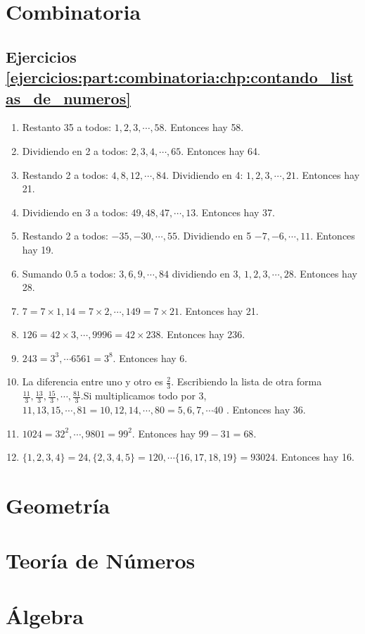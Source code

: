 \chapter{Combinatoria}\label{sol:chapter:combinatoria}



\section{Ejercicios \ref{ejercicios:part:combinatoria:chp:contando_listas_de_numeros}}
\begin{enumerate}
	\item Restanto 35 a todos: $1,2,3,\cdots, 58$. Entonces hay 58.
	\item Dividiendo en 2 a todos: $2,3,4,\cdots, 65$. Entonces hay 64.
	\item Restando 2 a todos: $4,8,12,\cdots, 84$. Dividiendo en 4: $1,2,3,\cdots, 21$. Entonces hay 21.
	\item Dividiendo en 3 a todos: $49,48,47,\cdots, 13$. Entonces hay 37.
	\item Restando 2 a todos: $-35, -30, \cdots, 55$. Dividiendo en 5 $-7,-6, \cdots, 11$. Entonces hay 19. 
	\item Sumando $0.5$ a todos: $3,6,9,\cdots, 84$ dividiendo en 3, $1,2,3,\cdots, 28$. Entonces hay 28.
	\item $7=7\times 1,14=7\times 2,\cdots, 149=7\times 21$. Entonces hay 21.
	\item $126=42\times 3, \cdots, 9996=42\times 238$. Entonces hay 236.
	
	\item $243=3^3,\cdots 6561=3^8$. Entonces hay 6.
	

	\item La diferencia entre uno y otro es $\frac{2}{3}$. Escribiendo la lista de otra forma $\frac{11}{3}, \frac{13}{3}, \frac{15}{3}, \cdots, \frac{81}{3}$.Si multiplicamos todo por 3, $11,13,15, \cdots, 81=10,12,14,\cdots, 80=5,6,7,\cdots40$ . Entonces hay 36.

	
	\item $1024=32^2,\cdots, 9801=99^2$. Entonces hay $99-31=68$.
	
	\item	$\{1,2,3,4\}=24, \{2,3,4,5\}=120, \cdots \{16,17,18,19\}=93024$. Entonces hay 16.

\end{enumerate}

\chapter{Geometr\'ia}\label{sol:chapter:geometria}


\chapter{Teor\'ia de N\'umeros}\label{sol:chapter:teoria_de_numeros}


\chapter{\'Algebra}\label{sol:chapter:algebra}